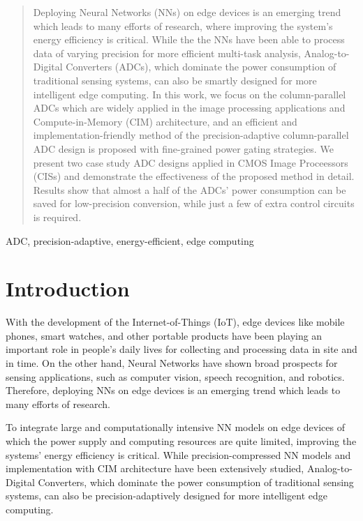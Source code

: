 \documentclass[conference]{IEEEtran}
\begin{document}
\begin{abstract}

Deploying Neural Networks (NNs) on edge devices is an emerging trend which leads to many efforts of research, where improving the system's energy efficiency is critical.
While the the NNs have been able to process data of varying precision for more efficient multi-task analysis, Analog-to-Digital Converters (ADCs), 
which dominate the power consumption of traditional sensing systems, can also be smartly designed for more intelligent edge computing. 
In this work, we focus on the column-parallel ADCs which are widely applied in the image processing applications and Compute-in-Memory (CIM) architecture, and 
an efficient and implementation-friendly method of the precision-adaptive column-parallel ADC design is proposed with fine-grained power gating strategies.
We present two case study ADC designs applied in CMOS Image Proceessors (CISs) and demonstrate the effectiveness of the proposed method in detail. 
Results show that almost a half of the ADCs’ power consumption can be saved for low-precision conversion, while just a few of extra control circuits is required.

\end{abstract}

\begin{IEEEkeywords}

ADC, precision-adaptive, energy-efficient, edge computing

\end{IEEEkeywords}

\section{Introduction}

With the development of the Internet-of-Things (IoT), edge devices like mobile phones, smart watches, and other portable products have been playing an important role in people’s daily lives 
for collecting and processing data in site and in time. On the other hand, Neural Networks have shown broad prospects for sensing applications, such as computer vision, speech recognition, 
and robotics. Therefore, deploying NNs on edge devices is an emerging trend which leads to many efforts of research. 

To integrate large and computationally intensive NN models on edge devices of which the power supply and computing resources are quite limited, improving the systems' energy efficiency is critical. 
While precision-compressed NN models \cite{leibe_xnor-net_2016}\cite{Ternary Weight Networks}\cite{park_energy-efficient_2018} and implementation with CIM architecture \cite{chiu_4-kb_2020}\cite{karunaratne_-memory_2020}\cite{jung_crossbar_2022} have been extensively studied, Analog-to-Digital Converters, which dominate the power consumption of 
traditional sensing systems, can also be precision-adaptively designed for more intelligent edge computing.
\end{document}
